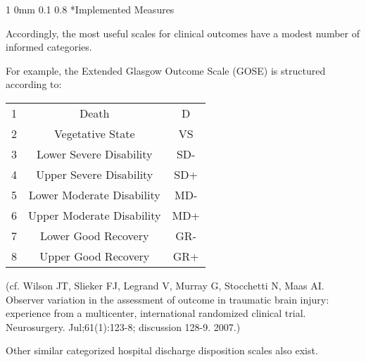 \documentclass[12pt]{article}
\makeatletter
\newcommand{\9}{\\[9pt]}
\renewcommand{\section}{\@startsection
	    {section}%
	    {1}%
	    {0mm}%
	    {0.1\baselineskip}%
	    {0.8\baselineskip}%
	    {\newpage \color[cmyk]{0.43,0,0.01,0} \center\LARGE}}%
\makeatother
\begin{document}
\begin{landscape}
\begin{Large}
{\section*{Implemented Measures}
\begin{ohlist}
    \item   Accordingly, the most useful scales for clinical outcomes have a modest number of informed categories.
    \item   For example, the \textcolor{MyEmph}{Extended Glasgow Outcome Scale} (GOSE) is structured according to:
            \begin{center}
            \begin{tabular}{|c|c|c|}
                \hline
                1   & Death                     & D \\
                2   & Vegetative State            & VS \\
                3   & Lower Severe Disability   & SD- \\
                4   & Upper Severe Disability   & SD+ \\
                5   & Lower Moderate Disability & MD- \\
                6   & Upper Moderate Disability & MD+ \\
                7   & Lower Good Recovery       & GR- \\
                8   & Upper Good Recovery       & GR+ \\
                \hline
            \end{tabular}
            \end{center}
            \vspace{11pt}
            (cf. Wilson JT, Slieker FJ, Legrand V, Murray G, Stocchetti N, Maas AI. Observer variation in the assessment of
            outcome in traumatic brain injury: experience from a multicenter, international randomized clinical trial. Neurosurgery.
            Jul;61(1):123-8; discussion 128-9. 2007.)
    \item   Other similar categorized hospital discharge disposition scales also exist.
\end{ohlist}

}
\end{Large}
\end{landscape}
\end{document}
